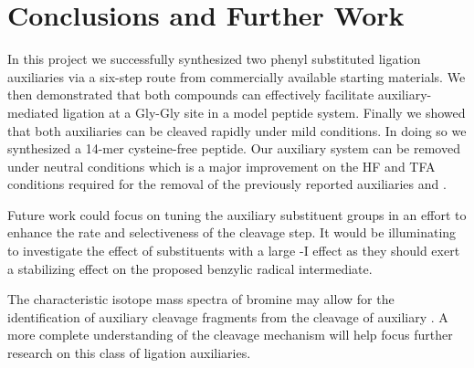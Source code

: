 \def\baselinestretch{1}
\chapter{Conclusions and Further Work}
\ifpdf
    \graphicspath{{Conclusions/ConclusionsFigs/PNG/}{Conclusions/ConclusionsFigs/PDF/}{Conclusions/ConclusionsFigs/}}
\else
    \graphicspath{{Conclusions/ConclusionsFigs/EPS/}{Conclusions/ConclusionsFigs/}}
\fi

\def\baselinestretch{1.66}

In this project we successfully synthesized two phenyl substituted ligation auxiliaries via a six-step route from commercially available starting materials. We then demonstrated that both compounds can effectively facilitate auxiliary-mediated ligation at a Gly-Gly site in a model peptide system. Finally we showed that both auxiliaries can be cleaved rapidly under mild conditions. In doing so we synthesized a 14-mer cysteine-free peptide. Our auxiliary system can be removed under neutral conditions which is a major improvement on the HF and TFA conditions required for the removal of the previously reported auxiliaries  and .

Future work could focus on tuning the auxiliary substituent groups in an effort to enhance the rate and selectiveness of the cleavage step. It would be illuminating to investigate the effect of substituents with a large -I effect as they should exert a stabilizing effect on the proposed benzylic radical intermediate.

The characteristic isotope mass spectra of bromine may allow for the identification of auxiliary cleavage fragments from the cleavage of auxiliary . A more complete understanding of the cleavage mechanism will help focus further research on this class of ligation auxiliaries.



